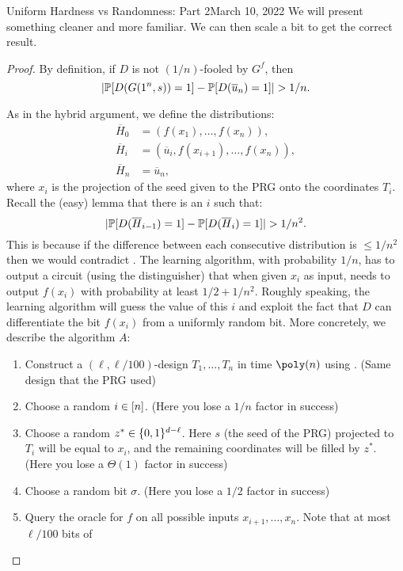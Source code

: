 \begin{lecture}{8}{Uniform Hardness vs Randomness: Part 2}{March 10, 2022}
We will present something cleaner and more familiar. We can then scale a bit to get the correct result.

\begin{proof}
	By definition, if $D$ is not $(1/n)$-fooled by $G^f$, then
	\begin{equation}\label{eq:dist-NW-prg}
		\lvert\mathbb{P}[D(G(1^n, s)) = 1] - \mathbb{P}[D(\overline{u}_n) = 1]\rvert > 1/n.
	\end{equation}
	
	As in the hybrid argument, we define the distributions:
	\begin{align*}
		\overline{H}_0 &= (f(x_1), \ldots, f(x_n)),\\
		\overline{H}_i &= (\overline{u}_i, f(x_{i + 1}), \ldots, f(x_n)),\\
		\overline{H}_n &= \overline{u}_n,
	\end{align*}
	where $x_i$ is the projection of the seed given to the PRG onto the
	coordinates $T_i$. Recall the (easy) lemma that there is an $i$ such that:
	\[
	\lvert\mathbb{P}[D(\overline{H}_{i - 1}) = 1] - \mathbb{P}[D(\overline{H}_i) = 1]\rvert > 1 / n^2.
	\]
	This is because if the difference between each consecutive distribution is $\leq 1/n^2$ then we would contradict .
	The learning algorithm, with probability $1/n$, has to output a circuit (using the distinguisher) that when given $x_i$ as input, needs to output $f(x_i)$ with probability at least $1/2 + 1/n^2$.
	Roughly speaking, the learning algorithm will guess the value of this $i$ and
	exploit the fact that $D$ can differentiate the bit $f(x_i)$ from a uniformly
	random bit. More concretely, we describe the algorithm $A$:
	\begin{enumerate}
		\item Construct a $(\ell, \ell/100)$-design $T_1, \dots, T_n$ in
		time $\poly(n)$ using . (Same design that the PRG used)
		\item Choose a random $i \in [n]$. (Here you lose a $1/n$ factor in success)
		\item Choose a random $z^* \in \{0, 1\}^{d - \ell}$. Here $s$
		(the seed of the PRG) projected to $T_i$ will be equal to $x_i$,
		and the remaining coordinates will be filled by $z^*$. (Here you lose a $\Theta(1)$ factor in success)
		\item Choose a random bit $\sigma$. (Here you lose a $1/2$ factor in success)
		\item Query the oracle for $f$ on all possible inputs
		$x_{i + 1}, \ldots , x_n$. Note that at most $\ell / 100$ bits of

\end{enumerate}
\end{proof}
\end{lecture}
